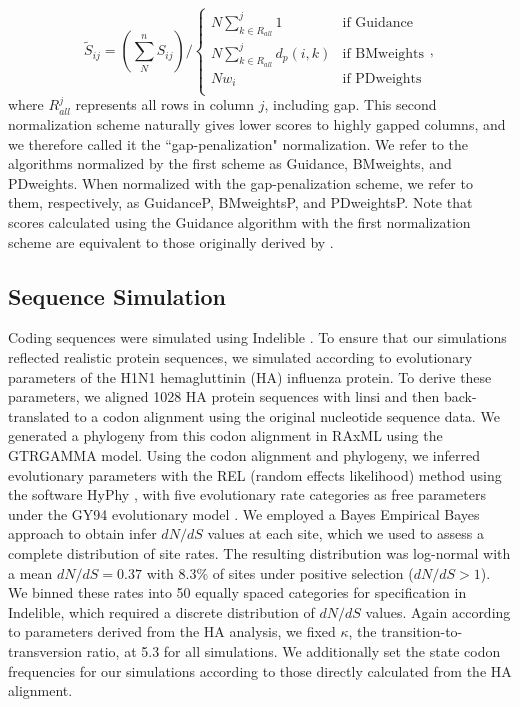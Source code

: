 \documentclass[10pt]{article}
\begin{document}
\begin{equation} \widetilde{S}_{ij} = (\sum_N^n S_{ij}) \bigg/ \left\{ \begin{array}{rl}
              N\sum\limits_{k \in R_{all}}^j 1                                  &\mbox{if Guidance} \\
              N\sum\limits_{k \in R_{all}}^j d_p(i,k)                         &\mbox{if BMweights} \\
   		  Nw_i                                       &\mbox{if PDweights} \\          
         \end{array} \right.,
\end{equation}
where $R_{all}^j$ represents all rows in column $j$, including gap. This second normalization scheme naturally gives lower scores to highly gapped columns, and we therefore called it the ``gap-penalization" normalization. We refer to the algorithms normalized by the first scheme as Guidance, BMweights, and PDweights. When normalized with the gap-penalization scheme, we refer to them, respectively, as GuidanceP, BMweightsP, and PDweightsP. Note that scores calculated using the Guidance algorithm with the first normalization scheme are equivalent to those originally derived by \citet{Penn2010}. 



\subsection*{Sequence Simulation}
Coding sequences were simulated using Indelible \citep{Fletcher2009}. To ensure that our simulations reflected realistic protein sequences, we simulated according to evolutionary parameters of the H1N1 hemagluttinin (HA) influenza protein. To derive these parameters, we aligned 1028 HA protein sequences with linsi \citep{Katoh2005} and then back-translated to a codon alignment using the original nucleotide sequence data. We generated a phylogeny from this codon alignment in RAxML \citep{Stamatakis2006} using the GTRGAMMA model. Using the codon alignment and phylogeny, we inferred evolutionary parameters with the REL (random effects likelihood)  method \citep{NielsenYang1998} using the software HyPhy \citep{Pond2005}, with five evolutionary rate categories as free parameters under the GY94 evolutionary model \citep{GoldmanYang1994}. We employed a Bayes Empirical Bayes approach \citep{Yang2000} to obtain infer $dN/dS$ values at each site, which we used to assess a complete distribution of site rates. The resulting distribution was log-normal with a mean $dN/dS = 0.37$ with 8.3\% of sites  under positive selection ($dN/dS>1$). We binned these rates into 50 equally spaced categories for specification in Indelible, which required a discrete distribution of $dN/dS$ values. Again according to parameters derived from the HA analysis, we fixed $\kappa$, the transition-to-transversion ratio, at 5.3 for all simulations. We additionally set the state codon frequencies for our simulations according to those directly calculated from the HA alignment. 
\end{document}

